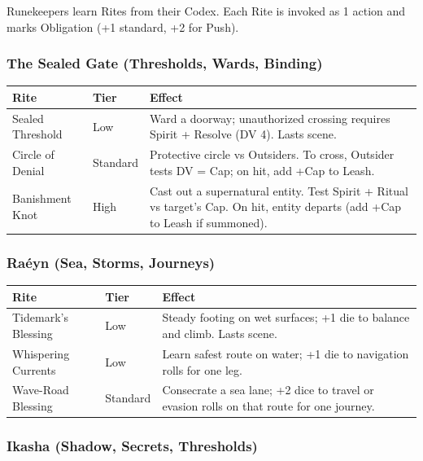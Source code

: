 Runekeepers learn Rites from their Codex. Each Rite is invoked as 1 action and marks Obligation (+1 standard, +2 for Push).

\subsubsection{The Sealed Gate (Thresholds, Wards, Binding)}

\begin{tabular}{@{}l>{\raggedright\arraybackslash}p{3cm}>{\raggedright\arraybackslash}p{7cm}@{}}
\toprule
\textbf{Rite} & \textbf{Tier} & \textbf{Effect} \\
\midrule
Sealed Threshold & Low & Ward a doorway; unauthorized crossing requires Spirit + Resolve (DV 4). Lasts scene. \\
Circle of Denial & Standard & Protective circle vs Outsiders. To cross, Outsider tests DV = Cap; on hit, add +Cap to Leash. \\
Banishment Knot & High & Cast out a supernatural entity. Test Spirit + Ritual vs target's Cap. On hit, entity departs (add +Cap to Leash if summoned). \\
\bottomrule
\end{tabular}

\subsubsection{Ra\'eyn (Sea, Storms, Journeys)}

\begin{tabular}{@{}l>{\raggedright\arraybackslash}p{3cm}>{\raggedright\arraybackslash}p{7cm}@{}}
\toprule
\textbf{Rite} & \textbf{Tier} & \textbf{Effect} \\
\midrule
Tidemark's Blessing & Low & Steady footing on wet surfaces; +1 die to balance and climb. Lasts scene. \\
Whispering Currents & Low & Learn safest route on water; +1 die to navigation rolls for one leg. \\
Wave-Road Blessing & Standard & Consecrate a sea lane; +2 dice to travel or evasion rolls on that route for one journey. \\
\bottomrule
\end{tabular}

\subsubsection{Ikasha (Shadow, Secrets, Thresholds)}


